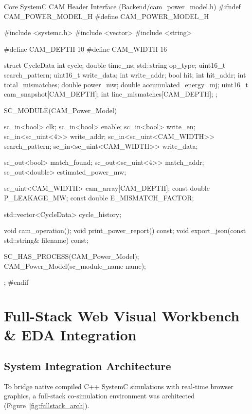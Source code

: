 \documentclass[11pt,a4paper,oneside]{report}
\begin{document}
\begin{codebox}{Core SystemC CAM Header Interface (Backend/cam\_power\_model.h)}
#ifndef CAM_POWER_MODEL_H
#define CAM_POWER_MODEL_H

#include <systemc.h>
#include <vector>
#include <string>

#define CAM_DEPTH 10
#define CAM_WIDTH 16

struct CycleData {
    int cycle;
    double time_ns;
    std::string op_type;
    uint16_t search_pattern;
    uint16_t write_data;
    int write_addr;
    bool hit;
    int hit_addr;
    int total_mismatches;
    double power_mw;
    double accumulated_energy_mj;
    uint16_t cam_snapshot[CAM_DEPTH];
    int line_mismatches[CAM_DEPTH];
};

SC_MODULE(CAM_Power_Model) {
    sc_in<bool>               clk;
    sc_in<bool>               enable;
    sc_in<bool>               write_en;
    sc_in<sc_uint<4>>         write_addr;
    sc_in<sc_uint<CAM_WIDTH>> search_pattern;
    sc_in<sc_uint<CAM_WIDTH>> write_data;

    sc_out<bool>              match_found;
    sc_out<sc_uint<4>>        match_addr;
    sc_out<double>            estimated_power_mw;

    sc_uint<CAM_WIDTH>        cam_array[CAM_DEPTH];
    const double              P_LEAKAGE_MW;
    const double              E_MISMATCH_FACTOR;

    std::vector<CycleData>    cycle_history;

    void cam_operation();
    void print_power_report() const;
    void export_json(const std::string& filename) const;

    SC_HAS_PROCESS(CAM_Power_Model);
    CAM_Power_Model(sc_module_name name);
};
#endif
\end{codebox}

\chapter[Web Visual Workbench]{Full-Stack Web Visual Workbench \& EDA Integration}

\section{System Integration Architecture}
To bridge native compiled C++ SystemC simulations with real-time browser graphics, a full-stack co-simulation environment was architected (Figure~\ref{fig:fullstack_arch}).
\end{document}
